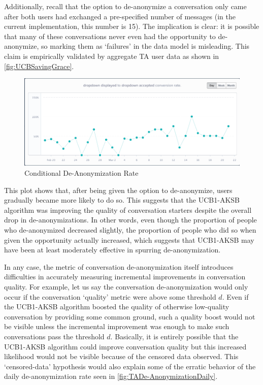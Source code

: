 Additionally, recall that the option to de-anonymize a conversation only came after both users had exchanged a pre-specified number of messages (in the current implementation, this number is 15). The implication is clear: it is possible that many of these conversations never even had the opportunity to de-anonymize, so marking them as `failures' in the data model is misleading. This claim is empirically validated by aggregate TA user data as shown in \autoref{fig:UCBSavingGrace}. 

\begin{figure}[H]
\centering
\includegraphics[trim= 1mm 1mm 0mm 1mm, clip, scale=0.45]{./Figures/UCBSavingGrace}
\caption{Conditional De-Anonymization Rate}
\label{fig:UCBSavingGrace}
\end{figure}

This plot shows that, after being given the option to de-anonymize, users gradually became more likely to do so. This suggests that the UCB1-AKSB algorithm was improving the quality of conversation starters despite the overall drop in de-anonymizations. In other words, even though the proportion of people who de-anonymized decreased slightly, the proportion of people who did so when given the opportunity actually increased, which suggests that UCB1-AKSB may have been at least moderately effective in spurring de-anonymization.

In any case, the metric of conversation de-anonymization itself introduces difficulties in accurately measuring incremental improvements in conversation quality. For example, let us say the conversation de-anonymization would only occur if the conversation `quality' metric were above some threshold $d$. Even if the UCB1-AKSB algorithm boosted the quality of otherwise low-quality conversation by providing some common ground, such a quality boost would not be visible unless the incremental improvement was enough to make such conversations pass the threshold $d$. Basically, it is entirely possible that the UCB1-AKSB algorithm could improve conversation quality but this increased likelihood would not be visible because of the censored data observed. This `censored-data' hypothesis would also explain some of the erratic behavior of the daily de-anonymization rate seen in \autoref{fig:TADe-AnonymizationDaily}.

